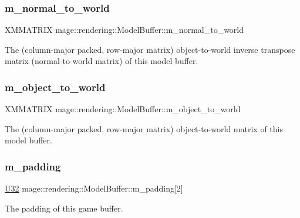 \subsubsection{\texorpdfstring{m\+\_\+normal\+\_\+to\+\_\+world}{m\_normal\_to\_world}}
{\footnotesize\ttfamily X\+M\+M\+A\+T\+R\+IX mage\+::rendering\+::\+Model\+Buffer\+::m\+\_\+normal\+\_\+to\+\_\+world}

The (column-\/major packed, row-\/major matrix) object-\/to-\/world inverse transpose matrix (normal-\/to-\/world matrix) of this model buffer. \hypertarget{structmage_1_1rendering_1_1_model_buffer_a1ab813830152789c92ff9313a291c8a2}{}\label{structmage_1_1rendering_1_1_model_buffer_a1ab813830152789c92ff9313a291c8a2} 
\subsubsection{\texorpdfstring{m\+\_\+object\+\_\+to\+\_\+world}{m\_object\_to\_world}}
{\footnotesize\ttfamily X\+M\+M\+A\+T\+R\+IX mage\+::rendering\+::\+Model\+Buffer\+::m\+\_\+object\+\_\+to\+\_\+world}

The (column-\/major packed, row-\/major matrix) object-\/to-\/world matrix of this model buffer. \hypertarget{structmage_1_1rendering_1_1_model_buffer_a70baa6277c4c247a1fd8ea86d822604c}{}\label{structmage_1_1rendering_1_1_model_buffer_a70baa6277c4c247a1fd8ea86d822604c} 
\subsubsection{\texorpdfstring{m\+\_\+padding}{m\_padding}}
{\footnotesize\ttfamily \hyperlink{namespacemage_a41c104c036fba3756a74e19f793eeaa1}{U32} mage\+::rendering\+::\+Model\+Buffer\+::m\+\_\+padding\mbox{[}2\mbox{]}}

The padding of this game buffer. \hypertarget{structmage_1_1rendering_1_1_model_buffer_acf90738f4c6cab2922d12e9fc9bf36ca}{}\label{structmage_1_1rendering_1_1_model_buffer_acf90738f4c6cab2922d12e9fc9bf36ca} 
